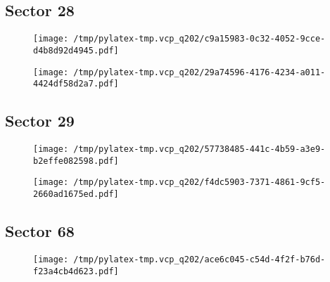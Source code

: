 \documentclass{report}%
\begin{document}
\subsection{Sector 28}%
\label{subsec:42593364428}%


\begin{figure}[H]%
\begin{center}%
\centering%
\texttt{[image: /tmp/pylatex-tmp.vcp\_q202/c9a15983-0c32-4052-9cce-d4b8d92d4945.pdf]}%
\end{center}%
\end{figure}

%


\begin{figure}[H]%
\begin{center}%
\centering%
\texttt{[image: /tmp/pylatex-tmp.vcp\_q202/29a74596-4176-4234-a011-4424df58d2a7.pdf]}%
\end{center}%
\end{figure}

%
\subsection{Sector 29}%
\label{subsec:42593364429}%


\begin{figure}[H]%
\begin{center}%
\centering%
\texttt{[image: /tmp/pylatex-tmp.vcp\_q202/57738485-441c-4b59-a3e9-b2effe082598.pdf]}%
\end{center}%
\end{figure}

%


\begin{figure}[H]%
\begin{center}%
\centering%
\texttt{[image: /tmp/pylatex-tmp.vcp\_q202/f4dc5903-7371-4861-9cf5-2660ad1675ed.pdf]}%
\end{center}%
\end{figure}

%
\subsection{Sector 68}%
\label{subsec:42593364468}%


\begin{figure}[H]%
\begin{center}%
\centering%
\texttt{[image: /tmp/pylatex-tmp.vcp\_q202/ace6c045-c54d-4f2f-b76d-f23a4cb4d623.pdf]}%
\end{center}%
\end{figure}
\end{document}
